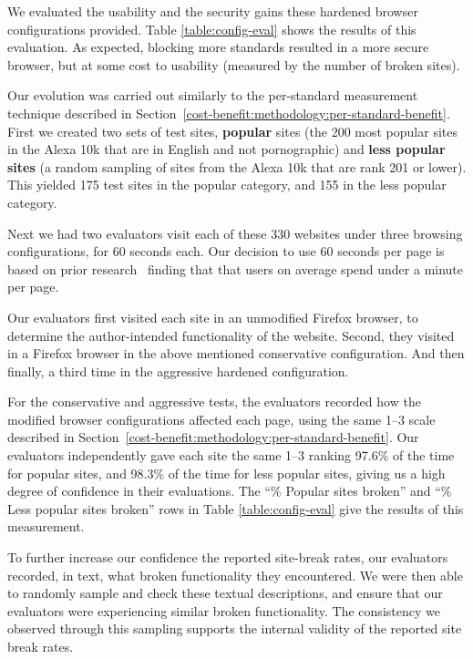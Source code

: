 We evaluated the usability and the security gains these hardened browser
configurations provided.  Table \ref{table:config-eval}
shows the results of this evaluation.  As expected, blocking more standards
resulted in a more secure browser, but at some cost to usability (measured
by the number of broken sites).

Our evolution was carried out similarly to the per-standard measurement
technique described in Section~\ref{cost-benefit:methodology:per-standard-benefit}.  First
we created two sets of test sites, \textbf{popular} sites (the 200 most popular
sites in the Alexa 10k that are in English and not pornographic) and
\textbf{less popular sites} (a random sampling of sites from the Alexa 10k that
are rank 201 or lower).  This yielded 175 test sites in the popular category,
and 155 in the less popular category.

Next we had two evaluators visit each of these 330 websites under three browsing
configurations, for 60 seconds each.  Our decision to use 60 seconds per page
is based on prior research~\cite{liu2010understanding} finding that
that users on average spend under a minute per page.

Our evaluators first visited each site in an unmodified
Firefox browser, to determine the author-intended functionality of the website.
Second, they visited in a Firefox browser in the above mentioned conservative
configuration.  And then finally, a third time in the aggressive hardened
configuration.

For the conservative and aggressive tests, the evaluators recorded how the
modified browser configurations affected each page, using the same 1--3 scale
described in Section~\ref{cost-benefit:methodology:per-standard-benefit}.  Our evaluators
independently gave each site the same 1--3 ranking 97.6\% of the time for
popular sites, and 98.3\% of the time for less popular sites, giving us
a high degree of confidence in their evaluations.  The ``\% Popular sites
broken'' and ``\% Less popular sites broken'' rows in Table
\ref{table:config-eval} give the results of this measurement.

To further increase our confidence the reported site-break rates, our evaluators
recorded, in text, what broken functionality they encountered.  We were then
able to randomly sample and check these textual
descriptions, and ensure that our evaluators were experiencing similar broken
functionality.  The consistency we observed through this sampling supports
the internal validity of the reported site break rates.

